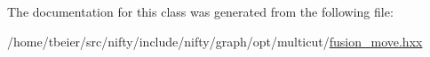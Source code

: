 The documentation for this class was generated from the following file\+:\begin{DoxyCompactItemize}
\item 
/home/tbeier/src/nifty/include/nifty/graph/opt/multicut/\hyperlink{multicut_2fusion__move_8hxx}{fusion\+\_\+move.\+hxx}\end{DoxyCompactItemize}
